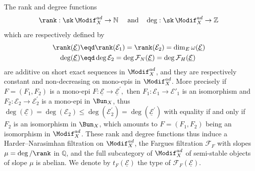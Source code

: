The rank and degree functions
\[
\rank:\sk\,\Modif_{X}^{ad}\rightarrow\mathbb{N}\quad\text{ and}\quad\deg:\sk\,\Modif_{X}^{ad}\rightarrow\mathbb{Z}
\]
which are respectively defined by
\[
\begin{aligned}\rank(\underline{\mathcal{E}}) & \eqd\rank(\mathcal{E}_{1})=\rank(\mathcal{E}_{2})=\dim_{E}\omega(\underline{\mathcal{E}})\\
\deg(\underline{\mathcal{E}}) & \eqd\deg\mathcal{E}_{2}=\deg\mathcal{F}_{N}(\underline{\mathcal{E}})=\deg\mathcal{F}_{H}(\underline{\mathcal{E}})
\end{aligned}
\]
$ $are additive on short exact sequences in $\Modif_{X}^{ad}$, and they are respectively constant and non-decreasing on mono-epis in $\Modif_{X}^{ad}$. More precisely if $F=(F_{1},F_{2})$ is a mono-epi $F:\underline{\mathcal{E}}\rightarrow\underline{\mathcal{E}}^{\prime},$ then $F_{1}:\mathcal{E}_{1}\rightarrow\mathcal{E}'_{1}$ is an isomorphism and $F_{2}:\mathcal{E}_{2}\rightarrow\mathcal{E}_{2}^{\prime}$ is a mono-epi in $\Bun_{X}$, thus $\deg(\underline{\mathcal{E}})=\deg(\mathcal{E}_{2})\leq\deg(\mathcal{E}_{2}^{\prime})=\deg(\underline{\mathcal{E}}^{\prime})$ with equality if and only if $F_{2}$ is an isomorphism in $\Bun_{X}$, which amounts to $F=(F_{1},F_{2})$ being an isomorphism in $\Modif_{X}^{ad}$. These rank and degree functions thus induce a Harder--Narasimhan filtration on $\Modif_{X}^{ad}$, the Fargues filtration $\mathcal{F}_{F}$ with slopes $\mu=\deg/\rank$ in $\mathbb{Q}$, and the full subcategory of $\Modif_{X}^{ad}$ of semi-stable objects of slope $\mu$ is abelian. We denote by $t_{F}(\underline{\mathcal{E}})$ the type of $\mathcal{F}_{F}(\underline{\mathcal{E}})$.


